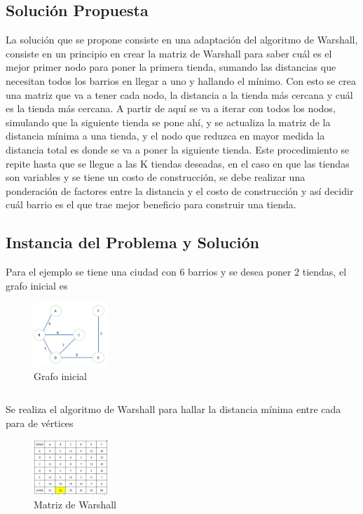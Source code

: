 \documentclass[conference,compsoc]{IEEEtran}
\begin{document}
\subsection{Solución Propuesta}
La solución que se propone consiste en una adaptación del algoritmo de Warshall, consiste en un principio en crear la matriz de Warshall para saber cuál es el mejor primer nodo para poner la primera tienda, sumando las distancias que necesitan todos los barrios en llegar a uno y hallando el mínimo.
Con esto se crea una matriz que va a tener cada nodo, la distancia a la tienda más cercana y cuál es la tienda más cercana. A partir de aquí se va a iterar con todos los nodos, simulando que la siguiente tienda se pone ahí, y se actualiza la matriz de la distancia mínima a una tienda, y el nodo que reduzca en mayor medida la distancia total es donde se va a poner la siguiente tienda.
Este procedimiento se repite hasta que se llegue a las K tiendas deseadas, en el caso en que las tiendas son variables y se tiene un costo de construcción, se debe realizar una ponderación de factores entre la distancia y el costo de construcción y así decidir cuál barrio es el que trae mejor beneficio para construir una tienda.

\subsection{Instancia del Problema y Solución}

Para el ejemplo se tiene una ciudad con 6 barrios y se desea poner 2 tiendas, el grafo inicial es 

\begin{figure}[h] 
    \centering
    \includegraphics[width=0.25\textwidth]{Problema1/p1.png}
    \caption{Grafo inicial}
    \label{fig:mesh1}
\end{figure}

$$$$$$$$

Se realiza el algoritmo de Warshall para hallar la distancia mínima entre cada para de vértices
\begin{figure}[h] 
    \centering
    \includegraphics[width=0.25\textwidth]{Problema1/p2.png}
    \caption{Matriz de Warshall}
    \label{fig:mesh1}
\end{figure}
\end{document}
